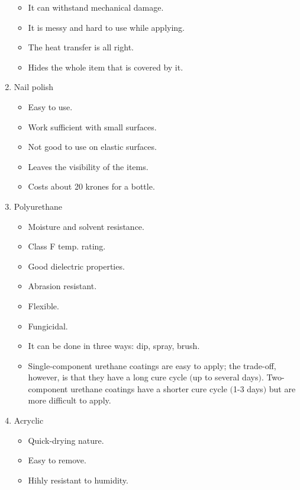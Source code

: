 \begin{enumerate}
          \begin{itemize}
              \item It can withstand mechanical damage.
              \item It is messy and hard to use while applying.
              \item The heat transfer is all right.
              \item Hides the whole item that is covered by it.
          \end{itemize}
    \item Nail polish
          \begin{itemize}
              \item Easy to use.
              \item Work sufficient with small surfaces.
              \item Not good to use on elastic surfaces.
              \item Leaves the visibility of the items.
              \item Costs about 20 krones for a bottle.
          \end{itemize}
    \item Polyurethane
          \begin{itemize}
              \item Moisture and solvent resistance.
              \item Class F temp. rating.
              \item Good dielectric properties.
              \item Abrasion resistant.
              \item Flexible.
              \item Fungicidal.
              \item It can be done in three ways: dip, spray, brush.
              \item Single-component urethane coatings are easy to apply; the trade-off, however, is that they have a long cure cycle $($up to several days$)$. Two-component urethane coatings have a shorter cure cycle $($1-3 days$)$ but are more difficult to apply.
          \end{itemize}
    \item Acryclic
          \begin{itemize}
              \item Quick-drying nature.
              \item Easy to remove.
              \item Hihly resistant to humidity.

\end{itemize}
\end{enumerate}
